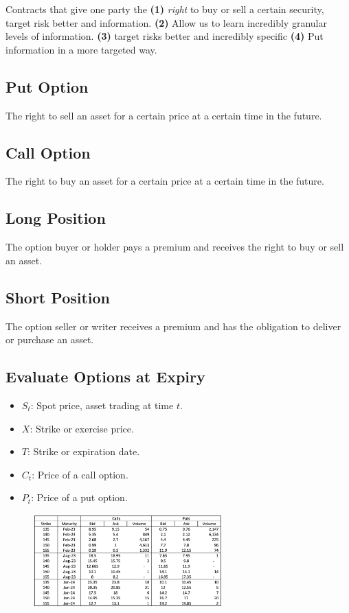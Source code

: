 Contracts that give one party the \textbf{(1)} \textit{right} to buy or sell a certain security, target risk better and information. \textbf{(2)} Allow us to learn incredibly granular levels of information. \textbf{(3)} target risks better and incredibly specific \textbf{(4)} Put information in a more targeted way. 

\begin{multicols}{2}
\subsection{Put Option}
The right to sell an asset for a certain price at a certain time in the future.
\subsection{Call Option}
The right to buy an asset for a certain price at a certain time in the future.
\subsection{Long Position}
The option buyer or holder pays a premium and receives the right to buy or sell an asset.
\subsection{Short Position}
The option seller or writer receives a premium and has the obligation to deliver or purchase an asset.
\subsection{Evaluate Options at Expiry}
\begin{itemize}
    \item $S_t$: Spot price, asset trading at time $t$.
    \item $X$: Strike or exercise price. 
    \item $T$: Strike or expiration date.
    \item $C_t$: Price of a call option.
    \item $P_t$: Price of a put option.
\end{itemize}

\end{multicols}

\begin{figure}[H]
    \centering 
    \includegraphics[width =0.65\textwidth]{Figure/option.png}
\end{figure}

